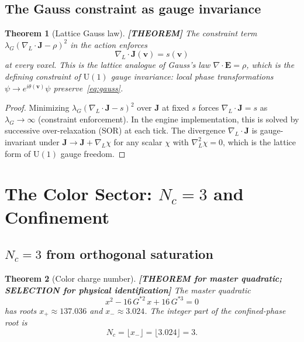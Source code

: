 \documentclass[11pt]{article}
\theoremstyle{tight}
\newtheorem{theorem}{Theorem}[section]
\theoremstyle{plainroman}
\begin{document}
\subsection{The Gauss constraint as gauge invariance}

\begin{theorem}[Lattice Gauss law]\label{thm:gauss}
\textbf{[THEOREM]}
The constraint term $\lambda_G(\nabla_L\!\cdot\!\mathbf J-\rho)^2$ in the action enforces
\begin{equation}\label{eq:gauss}
\nabla_L\!\cdot\!\mathbf J(\mathbf v)=s(\mathbf v)
\end{equation}
at every voxel.
This is the lattice analogue of Gauss's law $\nabla\!\cdot\!\mathbf E=\rho$, which is the defining constraint of $\mathrm{U}(1)$ gauge invariance: local phase transformations $\psi\to e^{i\theta(\mathbf v)}\psi$ preserve~\eqref{eq:gauss}.
\end{theorem}
\begin{proof}
Minimizing $\lambda_G(\nabla_L\!\cdot\!\mathbf J-s)^2$ over $\mathbf J$ at fixed $s$ forces $\nabla_L\!\cdot\!\mathbf J=s$ as $\lambda_G\to\infty$ (constraint enforcement).
In the engine implementation, this is solved by successive over-relaxation (SOR) at each tick.
The divergence $\nabla_L\!\cdot\!\mathbf J$ is gauge-invariant under $\mathbf J\to\mathbf J+\nabla_L\chi$ for any scalar $\chi$ with $\nabla_L^2\chi=0$, which is the lattice form of $\mathrm{U}(1)$ gauge freedom.
\end{proof}

\section{The Color Sector: $N_c=3$ and Confinement}

\subsection{$N_c=3$ from orthogonal saturation}

\begin{theorem}[Color charge number]\label{thm:Nc}
\textbf{[THEOREM for master quadratic; SELECTION for physical identification]}
The master quadratic
\[
x^2-16\,G^{*2}\,x+16\,G^{*3}=0
\]
has roots $x_+\approx 137.036$ and $x_-\approx 3.024$.
The integer part of the confined-phase root is
\[
N_c=\lfloor x_-\rfloor=\lfloor 3.024\rfloor=3.
\]
\end{theorem}
\end{document}

